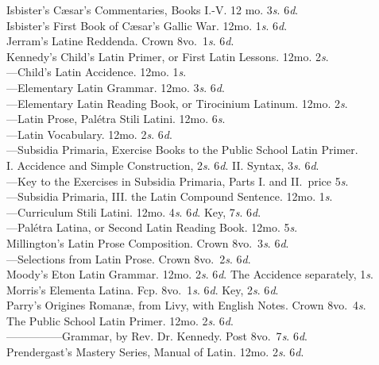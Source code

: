\documentclass[letterpaper,12pt,oneside,openany]{memoir}
\newcommand{\D}{\hspace*{5mm}}
\newcommand{\E}{\hspace*{2mm}---\hspace*{2mm}}
\begin{document}
\begin{footnotesize}
Isbister's C{\ae}sar's Commentaries, Books I.-V. 12 mo. 3\textit{s}. 6\textit{d}.\\
Isbister's First Book of C{\ae}sar's Gallic War. 12mo. 1\textit{s}. 6\textit{d}.\\
Jerram's Latine Reddenda. Crown 8vo.\ 1\textit{s}. 6\textit{d}.\\
Kennedy's Child's Latin Primer, or First Latin Lessons. 12mo. 2\textit{s}.\\
\E Child's Latin Accidence. 12mo. 1\textit{s}.\\
\E Elementary Latin Grammar. 12mo. 3\textit{s}. 6\textit{d}.\\
\E Elementary Latin Reading Book, or Tirocinium Latinum. 12mo. 2\textit{s}.\\
\E Latin Prose, Pal{\'e}tra Stili Latini. 12mo. 6\textit{s}.\\
\E Latin Vocabulary. 12mo. 2\textit{s}. 6\textit{d}.\\
\E Subsidia Primaria, Exercise Books to the Public School Latin Primer.\\
\D\D I\@. Accidence and Simple Construction, 2\textit{s}. 6\textit{d}. II\@. Syntax, 3\textit{s}. 6\textit{d}.\\
\E Key to the Exercises in Subsidia Primaria, Parts I. and II.\ price 5\textit{s}.\\
\E Subsidia Primaria, III. the Latin Compound Sentence. 12mo. 1\textit{s}.\\
\E Curriculum Stili Latini. 12mo. 4\textit{s}. 6\textit{d}. Key, 7\textit{s}. 6\textit{d}.\\
\E Pal{\'e}tra Latina, or Second Latin Reading Book. 12mo. 5\textit{s}.\\
Millington's Latin Prose Composition. Crown 8vo.\ 3\textit{s}. 6\textit{d}.\\
\E  Selections from Latin Prose. Crown 8vo.\ 2\textit{s}. 6\textit{d}.\\
Moody's Eton Latin Grammar. 12mo. 2\textit{s}. 6\textit{d}. The Accidence separately, 1\textit{s}.\\
Morris's Elementa Latina. Fcp. 8vo.\ 1\textit{s}. 6\textit{d}. Key, 2\textit{s}. 6\textit{d}.\\
Parry's Origines Roman{\ae}, from Livy, with English Notes. Crown 8vo.\ 4\textit{s}.\\
The Public School Latin Primer. 12mo. 2\textit{s}. 6\textit{d}.\\
\E \E \E \E \E Grammar, by Rev. Dr. Kennedy. Post 8vo.\ 7\textit{s}. 6\textit{d}.\\
Prendergast's Mastery Series, Manual of Latin. 12mo. 2\textit{s}. 6\textit{d}.\\

\end{footnotesize}
\end{document}
